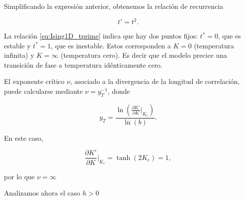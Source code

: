\documentclass[10pt]{article}
\begin{document}
Simplificando la expresi\'on anterior, obtenemos la relaci\'on de recurrencia

\begin{equation} \label{eq:Ising1D_tprime}
t' = t^2.
\end{equation}

La relaci\'on \ref{eq:Ising1D_tprime} indica que hay dos puntos fijos: $t^*=0$, que es estable y $t^*=1$, que es inestable. Estos corresponden a $K=0$ (temperatura infinita) y $K=\infty$ (temperatura cero). Es decir que el modelo precice una transici\'on de fase a temperatura id\'enticamente cero.

El exponente cr\'itico $\nu$, asociado a la divergencia de la longitud de correlaci\'on, puede calcularse mediante $\nu = y_T^{-1}$, donde 

\begin{equation}
y_T = \dfrac{\ln\left(\frac{\partial K'}{\partial K}\Bigr|_{K_c}\right)}{\ln (b)}.
\end{equation}

En este caso,

\begin{equation}
\frac{\partial K'}{\partial K}\Bigr|_{K_c} = \tanh(2K_c) = 1,
\end{equation}

por lo que $\nu = \infty$

Analizamos ahora el caso $h>0$
\end{document}
